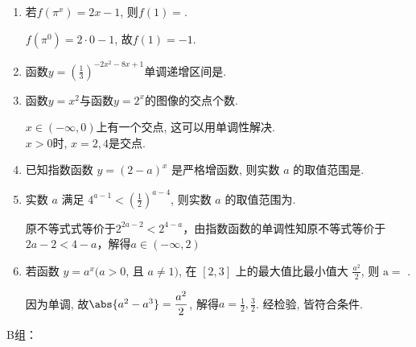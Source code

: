 \begin{enumerate}
\item 若$f(\pi^x)=2x-1$, 则$f(1)=$. 
\begin{jieda}
$f(\pi^0)=2\cdot0-1$, 故$f(1)=-1$. 
\end{jieda}


\item 函数$y=(\frac{1}{3})^{-2x^2-8x+1}$单调递增区间是\blkda{$[-2,+\infty)$}. 


\item 函数$y=x^2$与函数$y=2^x$的图像的交点个数. 
\begin{jieda}
$x\in(-\infty,0)$上有一个交点, 这可以用单调性解决. \\
$x>0$时, $x=2,4$是交点. 
\end{jieda}

\item 已知指数函数 $y=(2-a)^x$ 是严格增函数, 则实数 $a$ 的取值范围是.


\item 实数 $a$ 满足 $4^{a-1}<\left(\frac{1}{2}\right)^{a-4}$, 则实数 $a$ 的取值范围为.
\begin{jieda}
    原不等式式等价于$2^{2a-2}<2^{4-a}$，由指数函数的单调性知原不等式等价于$2a-2 < 4-a$，解得$a \in (-\infty, 2)$
\end{jieda}

\item 若函数 $y=a^x(a>0$, 且 $a \neq 1)$, 在 $[2,3]$ 上的最大值比最小值大 $\frac{a^2}{2}$, 则 $\mathrm{a}=$ .
\begin{jieda}
因为单调, 故$\abs{a^2-a^3}=\dfrac{a^2}{2}$, 解得$a=\frac{1}{2},\frac{3}{2}$. 经检验, 皆符合条件. 
\end{jieda}

\end{enumerate}


B组：

